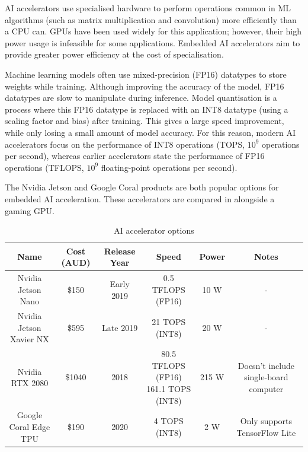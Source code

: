 \documentclass[12pt]{article}
\begin{document}
AI accelerators use specialised hardware to perform operations common in ML algorithms (such as matrix multiplication
and convolution) more efficiently than a CPU can. GPUs have been used widely for this application; however, their high
power usage is infeasible for some applications. Embedded AI accelerators aim to provide greater power efficiency
at the cost of specialisation.

Machine learning models often use mixed-precision (FP16) datatypes to store weights while training. Although improving the accuracy
of the model, FP16 datatypes are slow to manipulate during inference. Model quantisation \cite{jacobQuantizationTrainingNeural2017} is a process where this FP16 datatype is replaced with an
INT8 datatype (using a scaling factor and bias) after training.
This gives a large speed improvement, while only losing a small amount
of model accuracy.
For this reason, modern AI accelerators focus on the performance of INT8 operations (TOPS, $10^9$ operations per second),
whereas earlier accelerators state the performance of FP16 operations (TFLOPS, $10^9$ floating-point
operations per second).

The Nvidia Jetson and Google Coral products are both popular options for embedded AI acceleration. These accelerators are compared
in  alongside a gaming GPU. 

\begin{table}[H]
    \centering
\begin{adjustbox}{width=\textwidth}
    \begin{tabular}{c c c c c c}
    \toprule
    Name & Cost (AUD)\footnotemark[1] & Release Year & Speed & Power & Notes \\
    \midrule
    Nvidia Jetson Nano \cite{nvidiaJetsonNanoSystemonModule2019} & \$150 & Early 2019 & 0.5 TFLOPS (FP16) & 10 W & - \\
    Nvidia Jetson Xavier NX \cite{nvidiaJetsonXavierNX2019} & \$595 & Late 2019 & 21 TOPS (INT8) & 20 W & - \\
    Nvidia RTX 2080 \cite{nvidiaTuringGPUArchitecture2018} & \$1040 & 2018 & \makecell{80.5 TFLOPS (FP16)\\161.1 TOPS (INT8)} & 215 W & Doesn't include single-board computer \\
    Google Coral Edge TPU \cite{googlecoralCoralDevBoard2020} & \$190 & 2020 & 4 TOPS (INT8) & 2 W & Only supports TensorFlow Lite \\
    \bottomrule
    \end{tabular}
\end{adjustbox}
    \caption{AI accelerator options}
    \label{table:compute_element}
\end{table}
\end{document}
